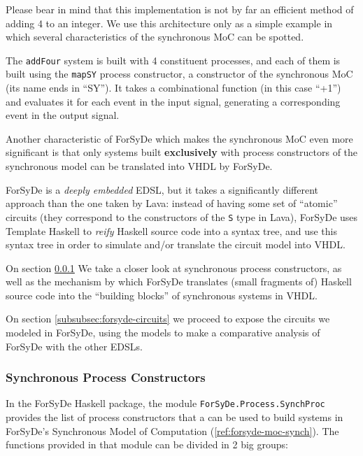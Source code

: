             Please bear in mind that this implementation is not by far an efficient method of adding
            4 to an integer. We use this architecture only as a simple example in which several
            characteristics of the synchronous \ac{MoC} can be spotted.

            The \texttt{addFour} system is built with 4 constituent processes, and each of them is
            built using the \texttt{mapSY} process constructor, a constructor of the synchronous
            \ac{MoC} (its name ends in ``SY''). It takes a combinational function (in this case
            ``+1'') and evaluates it for each event in the input signal, generating a corresponding
            event in the output signal.

            Another characteristic of ForSyDe which makes the synchronous \ac{MoC} even more
            significant is that only systems built \textbf{exclusively} with process constructors of
            the synchronous model can be translated into VHDL by ForSyDe.

            ForSyDe is a \emph{deeply embedded} EDSL, but it takes a significantly different
            approach than the one taken by Lava: instead of having some set of ``atomic'' circuits
            (they correspond to the constructors of the \texttt{S} type in Lava), ForSyDe uses
            Template Haskell to \emph{reify} Haskell source code into a syntax tree, and use this
            syntax tree in order to simulate and/or translate the circuit model into VHDL.

            On section \ref{subsubsec:forsyde-synchprocs} We take a closer look at synchronous
            process constructors, as well as the mechanism by which ForSyDe translates (small
            fragments of) Haskell source code into the ``building blocks'' of synchronous systems in
            VHDL.

            On section \ref{subsubsec:forsyde-circuits} we proceed to expose the circuits we modeled
            in ForSyDe, using the models to make a comparative analysis of ForSyDe with the other
            EDSLs.

        \subsubsection{Synchronous Process Constructors}
        \label{subsubsec:forsyde-synchprocs}
            In the ForSyDe Haskell package, the module \texttt{ForSyDe.Process.SynchProc} provides
            the list of process constructors that a can be used to build systems in ForSyDe's
            Synchronous Model of Computation (\ref{ref:forsyde-moc-synch}). The functions provided
            in that module can be divided in 2 big groups:

